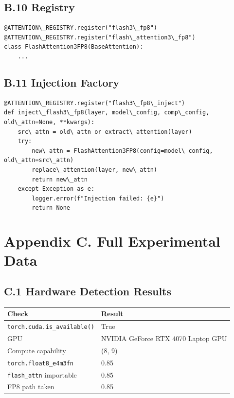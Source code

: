 \subsection{B.10 Registry}

\begin{lstlisting}
@ATTENTION\_REGISTRY.register("flash3\_fp8")
@ATTENTION\_REGISTRY.register("flash\_attention3\_fp8")
class FlashAttention3FP8(BaseAttention):
    ...
\end{lstlisting}

\subsection{B.11 Injection Factory}

\begin{lstlisting}
@ATTENTION\_REGISTRY.register("flash3\_fp8\_inject")
def inject\_flash3\_fp8(layer, model\_config, comp\_config, old\_attn=None, **kwargs):
    src\_attn = old\_attn or extract\_attention(layer)
    try:
        new\_attn = FlashAttention3FP8(config=model\_config, old\_attn=src\_attn)
        replace\_attention(layer, new\_attn)
        return new\_attn
    except Exception as e:
        logger.error(f"Injection failed: {e}")
        return None
\end{lstlisting}




\section{Appendix C. Full Experimental Data}

\subsection{C.1 Hardware Detection Results}

\begin{table}[H]
\centering
\small
\begin{tabular}{ll}
\toprule
\textbf{Check} & \textbf{Result} \\
\midrule
\texttt{torch.cuda.is\_available()} & True \\
GPU & NVIDIA GeForce RTX 4070 Laptop GPU \\
Compute capability & (8, 9) \\
\texttt{torch.float8\_e4m3fn} & 0.85 \\
\texttt{flash\_attn} importable & 0.85 \\
FP8 path taken & 0.85 \\
\bottomrule
\end{tabular}
\end{table}


